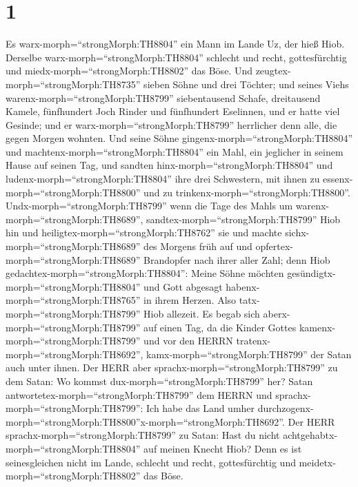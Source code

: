 \hypertarget{section}{%
\section{1}\label{section}}

 Es warx-morph=``strongMorph:TH8804'' ein Mann im Lande Uz,
der hieß Hiob. Derselbe warx-morph=``strongMorph:TH8804'' schlecht und
recht, gottesfürchtig und miedx-morph=``strongMorph:TH8802'' das Böse.
 Und zeugtex-morph=``strongMorph:TH8735'' sieben Söhne und
drei Töchter;  und seines Viehs
warenx-morph=``strongMorph:TH8799'' siebentausend Schafe, dreitausend
Kamele, fünfhundert Joch Rinder und fünfhundert Eselinnen, und er hatte
viel Gesinde; und er warx-morph=``strongMorph:TH8799'' herrlicher denn
alle, die gegen Morgen wohnten.  Und seine Söhne
gingenx-morph=``strongMorph:TH8804'' und
machtenx-morph=``strongMorph:TH8804'' ein Mahl, ein jeglicher in seinem
Hause auf seinen Tag, und sandten hinx-morph=``strongMorph:TH8804'' und
ludenx-morph=``strongMorph:TH8804'' ihre drei Schwestern, mit ihnen zu
essenx-morph=``strongMorph:TH8800'' und zu
trinkenx-morph=``strongMorph:TH8800''. 
Undx-morph=``strongMorph:TH8799'' wenn die Tage des Mahls um
warenx-morph=``strongMorph:TH8689'',
sandtex-morph=``strongMorph:TH8799'' Hiob hin und
heiligtex-morph=``strongMorph:TH8762'' sie und machte
sichx-morph=``strongMorph:TH8689'' des Morgens früh auf und
opfertex-morph=``strongMorph:TH8689'' Brandopfer nach ihrer aller Zahl;
denn Hiob gedachtex-morph=``strongMorph:TH8804'': Meine Söhne möchten
gesündigtx-morph=``strongMorph:TH8804'' und Gott abgesagt
habenx-morph=``strongMorph:TH8765'' in ihrem Herzen. Also
tatx-morph=``strongMorph:TH8799'' Hiob allezeit.  Es begab
sich aberx-morph=``strongMorph:TH8799'' auf einen Tag, da die Kinder
Gottes kamenx-morph=``strongMorph:TH8799'' und vor den HERRN
tratenx-morph=``strongMorph:TH8692'', kamx-morph=``strongMorph:TH8799''
der Satan auch unter ihnen.  Der HERR aber
sprachx-morph=``strongMorph:TH8799'' zu dem Satan: Wo kommst
dux-morph=``strongMorph:TH8799'' her? Satan
antwortetex-morph=``strongMorph:TH8799'' dem HERRN und
sprachx-morph=``strongMorph:TH8799'': Ich habe das Land umher
durchzogenx-morph=``strongMorph:TH8800''x-morph=``strongMorph:TH8692''.
 Der HERR sprachx-morph=``strongMorph:TH8799'' zu Satan:
Hast du nicht achtgehabtx-morph=``strongMorph:TH8804'' auf meinen Knecht
Hiob? Denn es ist seinesgleichen nicht im Lande, schlecht und recht,
gottesfürchtig und meidetx-morph=``strongMorph:TH8802'' das Böse.

